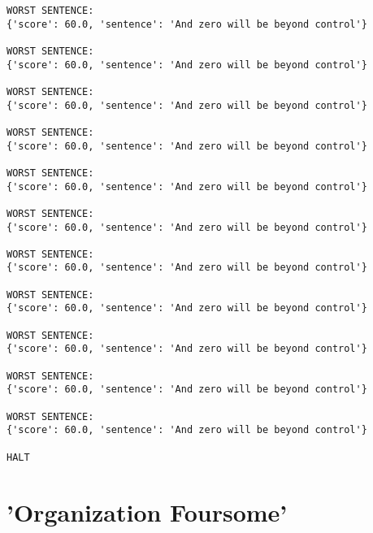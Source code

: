 \documentclass[12pt,a4paper,oneside]{book}
\begin{document}
\begin{verbatim}
WORST SENTENCE:
{'score': 60.0, 'sentence': 'And zero will be beyond control'}

WORST SENTENCE:
{'score': 60.0, 'sentence': 'And zero will be beyond control'}

WORST SENTENCE:
{'score': 60.0, 'sentence': 'And zero will be beyond control'}

WORST SENTENCE:
{'score': 60.0, 'sentence': 'And zero will be beyond control'}

WORST SENTENCE:
{'score': 60.0, 'sentence': 'And zero will be beyond control'}

WORST SENTENCE:
{'score': 60.0, 'sentence': 'And zero will be beyond control'}

WORST SENTENCE:
{'score': 60.0, 'sentence': 'And zero will be beyond control'}

WORST SENTENCE:
{'score': 60.0, 'sentence': 'And zero will be beyond control'}

WORST SENTENCE:
{'score': 60.0, 'sentence': 'And zero will be beyond control'}
 
WORST SENTENCE:
{'score': 60.0, 'sentence': 'And zero will be beyond control'}

WORST SENTENCE:
{'score': 60.0, 'sentence': 'And zero will be beyond control'}
 
HALT 

\end{verbatim}
\newpage

\chapter*{'Organization Foursome'}
\end{document}
